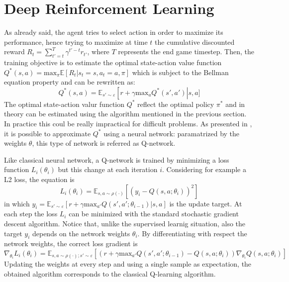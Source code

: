 \documentclass[article,11pt]{article}
\begin{document}
	\section{Deep Reinforcement Learning}
	As already said, the agent tries to select action in order to maximize its performance, hence trying to maximize at time $t$ the cumulative discounted reward $R_t = \sum_{t'=t}^{T}\gamma^{t'-t}r_{t'}$, where $T$ represents the end game timestep. Then, the training objective is to estimate the optimal state-action value function $Q^*(s,a) =\text{max}_\pi \mathbb{E}\left[R_t | s_t=s, a_t=a, \pi\right]$ which is subject to the Bellman equation property and can be rewritten as:
	\begin{equation}
		Q^*(s,a) = \mathbb{E}_{s'\sim\varepsilon}\left[r + \gamma \text{max}_{a}Q^*(s',a')\right | s, a]
	\end{equation} 
	The optimal state-action valur function $Q^*$ reflect the optimal policy $\pi^*$ and in theory can be estimated using the algorithm mentioned in the previous section. In practice this coul be really impractical for difficult problems.
	As presented in \cite{dqn2013}, it is possible to approximate $Q^*$ using a neural network: paramatrized by the weights $\theta$, this type of network is referred as Q-network.
	
	Like classical neural network, a Q-network is trained by minimizing a loss function $L_i(\theta_i)$ but this change at each iteration $i$. Considering for example a L2 loss, the equation is
	\begin{equation}
		L_i(\theta_i) = \mathbb{E}_{s,a\sim\rho(\cdot)} \left[ (y_i - Q(s,a;\theta_i))^2 \right]
		\label{lossdqn}
	\end{equation}
	in which $y_i=\mathbb{E}_{s'\sim\varepsilon} \left[ r+ \gamma \text{max}_{a'}Q(s',a';\theta_{i-1})|s,a \right]$ is the update target.
	At each step the loss $L_i$ can be minimized with the standard stochastic gradient descent algorithm. Notice that, unlike the supervised learnig situation, also the target $y_i$ depends on the network weights $\theta_i$. By differentiating with respect the network weights, the correct loss gradient is
	\begin{equation}
		\nabla_{\theta_i} L_i(\theta_i) = \mathbb{E}_{s,a\sim\rho(\cdot);s'\sim\varepsilon} \left[ \left( r+\gamma \text{max}_{a'}Q(s',a';\theta_{i-1}) - Q(s,a;\theta_i) \right) \nabla_{\theta_i} Q(s,a;\theta_i) \right]
	\end{equation}
	Updating the weights at every step and using a single sample as expectation, the obtained algorithm corresponds to the classical Q-learning algorithm.\\
	
\end{document}
